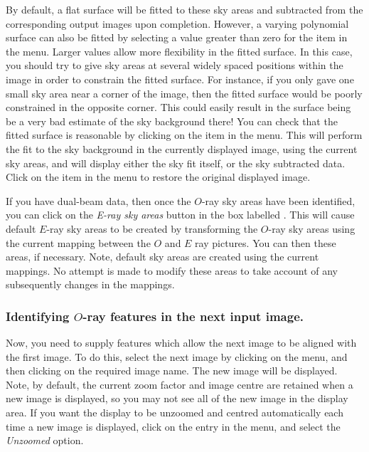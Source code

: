 \documentclass[11pt,nolof]{starlink}
\begin{document}
By default, a flat surface will be fitted to these sky areas and
subtracted from the corresponding output images upon completion. However,
a varying polynomial surface can also be fitted by selecting a value
greater than zero for the  item
in the  menu. Larger values
allow more flexibility in the fitted surface. In this case, you should
try to give sky areas at several widely spaced positions within the image
in order to constrain the fitted surface. For instance, if you only gave
one small sky area near a corner of the image, then the fitted surface
would be poorly constrained in the opposite corner. This could easily
result in the surface being be a very bad estimate of the sky background
there! You can check that the fitted surface is reasonable by clicking on
the  item in the
 menu. This will perform
the fit to the sky background in the currently displayed image, using the
current sky areas, and will display either the sky fit itself, or the sky
subtracted data. Click on the
 item in the
 menu to restore the original
displayed image.

If you have dual-beam data, then once the $O$-ray sky areas have been
identified, you can click on the \emph{E-ray sky areas} button in the box
labelled . This will cause default
$E$-ray sky areas to be created by transforming the $O$-ray sky areas
using the current mapping between the $O$ and $E$ ray pictures. You can
then  these
areas, if necessary. Note, default sky areas are created using the
current mappings. No attempt is made to modify these areas to take
account of any subsequently changes in the mappings.

\subsubsection {Identifying $O$-ray features in the next input image.}
Now, you need to supply features which allow the next image to be
aligned with the first image. To do this, select the next image by
clicking on the  menu, and then
clicking on the required image name. The new image will be displayed.
Note, by default, the current zoom factor and image centre are retained
when a new image is displayed, so you may not see all of the new image in
the display area. If you want the display to be unzoomed and centred
automatically each time a new image is displayed, click on the
 entry in the  menu, and select the \emph{Unzoomed} option.
\end{document}
